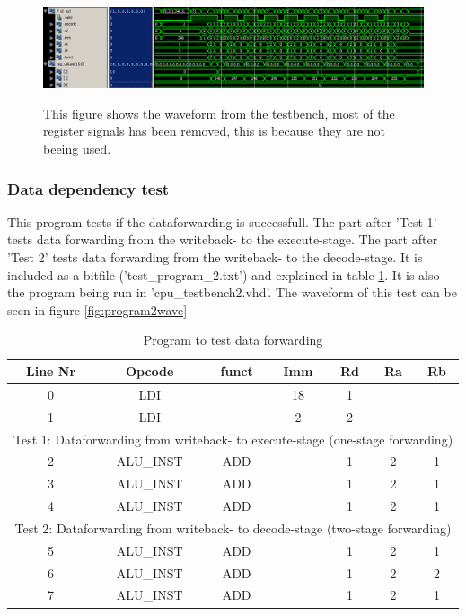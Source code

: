 \documentclass[11pt]{report}
\begin{document}
\begin{figure}
  \centering
  \includegraphics[width=.95\linewidth]{test1.png} \\
  \caption{This figure shows the waveform from the testbench, 
  most of the register signals has been removed, this is because they are not beeing used.}
  \label{fig:program1wave}
\end{figure}


\subsubsection*{Data dependency test}

This program tests if the dataforwarding is successfull. The part after 'Test 1' tests data forwarding
from the writeback- to the execute-stage. The part after 'Test 2' tests data forwarding from the
writeback- to the decode-stage. It is included as a bitfile ('test\_program\_2.txt') and explained
in table \ref{tab:program2table}. It is also the program being run in 'cpu\_testbench2.vhd'.
The waveform of this test can be seen in figure \ref{fig:program2wave}

\begin{table}[htbp]
  \centering
  \begin{tabular}{|c|c|c|c|c|c|c|}
    \hline
    Line Nr &	Opcode		&	funct	&	Imm	&	Rd	&	Ra	&	Rb	\\\hline
    	0	&	LDI			&			&	18	&	1	&		&		\\\hline
    	1	&	LDI			&			&	2	&	2	&		&		\\\hline
	\multicolumn{7}{|c|}{Test 1: Dataforwarding from writeback- to execute-stage (one-stage forwarding)}\\\hline
    	2	&	ALU\_INST	&	ADD		&		&	1	&	2	&	1	\\\hline
    	3	&	ALU\_INST	&	ADD		&		&	1	&	2	&	1	\\\hline
    	4	&	ALU\_INST	&	ADD		&		&	1	&	2	&	1	\\\hline
	\multicolumn{7}{|c|}{Test 2: Dataforwarding from writeback- to decode-stage (two-stage forwarding)}\\\hline
    	5	&	ALU\_INST	&	ADD		&		&	1	&	2	&	1	\\\hline
    	6	&	ALU\_INST	&	ADD		&		&	1	&	2	&	2	\\\hline
    	7	&	ALU\_INST	&	ADD		&		&	1	&	2	&	1	\\\hline
  \end{tabular}
  \caption{Program to test data forwarding}
  \label{tab:program2table}
\end{table}
\end{document}
